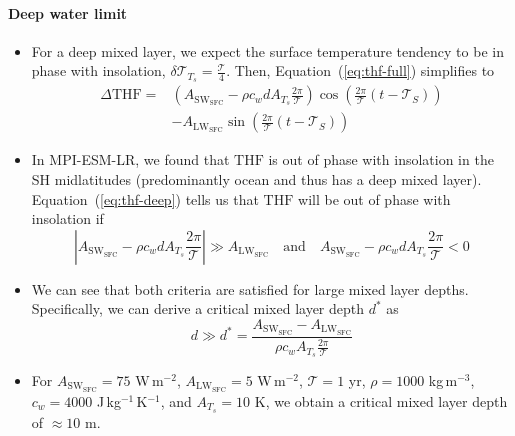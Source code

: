 \documentclass{ametsocV5}
\begin{document}
        \paragraph{Deep water limit}
        \begin{itemize}
          \item For a deep mixed layer, we expect the surface temperature tendency to be in phase with insolation, $\delta\mathscr{T}_{T_{s}} = \frac{\mathcal{T}}{4}$. Then, Equation~(\ref{eq:thf-full}) simplifies to
                \begin{equation} \label{eq:thf-deep}
                  \begin{aligned}
                    \Delta \mathrm{THF} =& \left( A_{\mathrm{SW_{SFC}}} - \rho c_{w} d A_{T_{s}}\frac{2\pi}{\mathcal{T}} \right) \cos\left(\frac{2\pi}{\mathcal{T}}(t-\mathscr{T}_{S})\right) \\
                    &- A_{\mathrm{LW_{SFC}}} \sin\left(\frac{2\pi}{\mathcal{T}}(t-\mathscr{T}_{S})\right)
                  \end{aligned}
                \end{equation}
          \item In MPI-ESM-LR, we found that $\mathrm{THF}$ is out of phase with insolation in the SH midlatitudes (predominantly ocean and thus has a deep mixed layer). Equation~(\ref{eq:thf-deep}) tells us that $\mathrm{THF}$ will be out of phase with insolation if
                \begin{equation} \label{eq:d-deep}
                  \left|A_{\mathrm{SW_{SFC}}} - \rho c_{w}d A_{T_{s}}\frac{2\pi}{\mathcal{T}}\right| \gg A_{\mathrm{LW_{SFC}}} \quad \text{and} \quad A_{\mathrm{SW_{SFC}}} - \rho c_{w}d A_{T_{s}}\frac{2\pi}{\mathcal{T}} < 0
                \end{equation}
          \item We can see that both criteria are satisfied for large mixed layer depths. Specifically, we can derive a critical mixed layer depth $d^{*}$ as
                \begin{equation}
                  d \gg d^{*} = \frac{A_{\mathrm{SW_{SFC}}}-A_{\mathrm{LW_{SFC}}}}{\rho c_{w} A_{T_{s}}\frac{2\pi}{\mathcal{T}}}
                \end{equation}
          \item For $A_{\mathrm{SW_{SFC}}}=75$ W$\,$m$^{-2}$, $A_{\mathrm{LW_{SFC}}}=5$ W$\,$m$^{-2}$, $\mathcal{T}=1$ yr, $\rho=1000$ kg$\,$m$^{-3}$, $c_{w}=4000$ J$\,$kg$^{-1}$$\,$K$^{-1}$, and $A_{T_{s}}=10$ K, we obtain a critical mixed layer depth of $\approx 10$ m.
\end{itemize}
\end{document}
